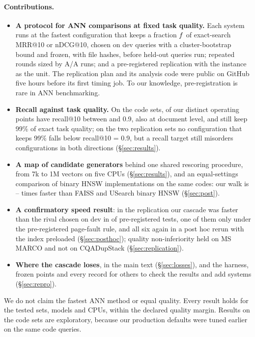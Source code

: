 \paragraph{Contributions.}
\begin{itemize}\setlength{\itemsep}{1pt}
\item \textbf{A protocol for ANN comparisons at fixed task quality.} Each system runs at the fastest configuration that
keeps a fraction $f$ of exact-search MRR@10 or nDCG@10, chosen on dev queries with a cluster-bootstrap bound and frozen,
with file hashes, before held-out queries run; repeated rounds sized by A/A runs; and a pre-registered replication with
the instance as the unit. The replication plan and its analysis code were public
on GitHub five hours before its first timing job. To our knowledge, pre-registration is rare in ANN benchmarking.
\item \textbf{Recall against task quality.} On the code sets,  of our  distinct operating
points have recall@10 between  and 0.9, also at document level, and still keep 99\% of exact task
quality; on the two replication sets no configuration that keeps 99\% falls below recall@10 = 0.9, but a recall target
still misorders configurations in both directions (\S\ref{sec:results}).
\item \textbf{A map of candidate generators} behind one shared rescoring procedure, from 7k to 1M vectors on five CPUs
(\S\ref{sec:results}), and an equal-settings comparison of binary HNSW implementations on the same codes: our walk is
-- times faster than FAISS and USearch binary HNSW (\S\ref{sec:post}).
\item \textbf{A confirmatory speed result}: in the replication our cascade was faster than the rival chosen on dev in
 of  pre-registered tests, one of them only under the pre-registered page-fault rule, and all six
again in a post hoc rerun with the index preloaded (\S\ref{sec:posthoc}); quality non-inferiority held on MS MARCO and not
on CQADupStack
(\S\ref{sec:replication}).
\item \textbf{Where the cascade loses}, in the main text (\S\ref{sec:losses}), and the harness, frozen points and every
record for others to check the results and add systems (\S\ref{sec:repro}).
\end{itemize}

We do not claim the fastest ANN method or equal quality. Every result holds for the tested sets, models and CPUs, within
the declared quality margin. Results on the code sets are exploratory, because our production defaults were tuned
earlier on the same code queries.
